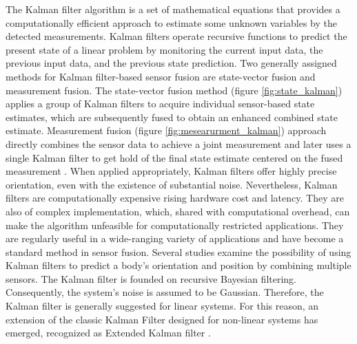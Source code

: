The Kalman filter algorithm is a set of mathematical equations that provides a computationally efficient approach to estimate some unknown variables by the detected measurements\cite{welch1995introduction}. Kalman filters operate recursive functions to predict the present state of a linear problem by monitoring the current input data, the previous input data, and the previous state prediction. Two generally assigned methods for Kalman filter-based sensor fusion are state-vector fusion and measurement fusion. The state-vector fusion method (figure \ref{fig:state_kalman}) applies a group of Kalman filters to acquire individual sensor-based state estimates, which are subsequently fused to obtain an enhanced combined state estimate. Measurement fusion (figure \ref{fig:mesearurment_kalman}) approach directly combines the sensor data to achieve a joint measurement and later uses a single Kalman filter to get hold of the final state estimate centered on the fused measurement \cite{mosallaei2007process}.
When applied appropriately, Kalman filters offer highly precise orientation, even with the existence of substantial noise. Nevertheless, Kalman filters are computationally expensive rising hardware cost and latency. They are also of complex implementation, which, shared with computational overhead, can make the algorithm unfeasible for computationally restricted applications. They are regularly useful in a wide-ranging variety of applications and have become a standard method in sensor fusion. Several studies examine the possibility of using Kalman filters to predict a body’s orientation and position by combining multiple sensors. The Kalman filter is founded on recursive Bayesian filtering.
Consequently, the system’s noise is assumed to be Gaussian. Therefore, the Kalman filter is generally suggested for linear systems. For this reason, an extension of the classic Kalman Filter designed for non-linear systems has emerged, recognized as Extended Kalman filter \cite{wilson2019formulation}.


